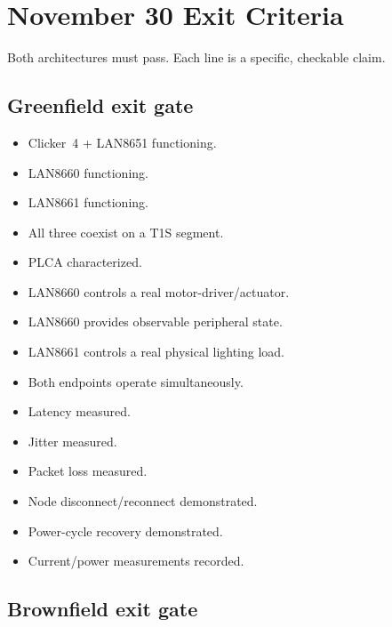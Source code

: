 \section{November 30 Exit Criteria}
\label{sec:exit-criteria}

Both architectures must pass. Each line is a specific, checkable claim.

\subsection{Greenfield exit gate}

\begin{itemize}[itemsep=0.1em, label={$\square$}]
\item Clicker~4 + LAN8651 functioning.
\item LAN8660 functioning.
\item LAN8661 functioning.
\item All three coexist on a T1S segment.
\item PLCA characterized.
\item LAN8660 controls a real motor-driver/actuator.
\item LAN8660 provides observable peripheral state.
\item LAN8661 controls a real physical lighting load.
\item Both endpoints operate simultaneously.
\item Latency measured.
\item Jitter measured.
\item Packet loss measured.
\item Node disconnect/reconnect demonstrated.
\item Power-cycle recovery demonstrated.
\item Current/power measurements recorded.
\end{itemize}

\subsection{Brownfield exit gate}

